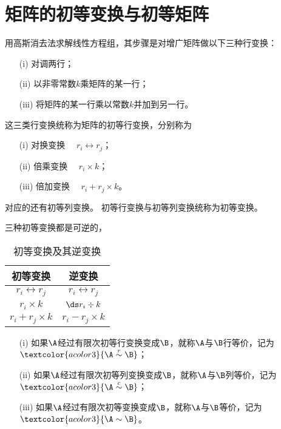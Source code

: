 \section{矩阵的初等变换与初等矩阵}

\begin{frame}\ft{\secname}
用高斯消去法求解线性方程组，其步骤是对增广矩阵做以下三种行变换：
\begin{itemize}
	\item[(i)] 对调两行；
	\item[(ii)] 以非零常数$k$乘矩阵的某一行；
	\item[(iii)] 将矩阵的某一行乘以常数$k$并加到另一行。
\end{itemize}
这三类行变换统称为\textcolor{acolor3}{矩阵的初等行变换}，\pause 分别称为
\begin{itemize}
	\item[(i)] \textcolor{acolor3}{对换变换}  $\quad r_i \leftrightarrow r_j$；
	\item[(ii)] \textcolor{acolor3}{倍乘变换}       $\quad r_i \times k$；
	\item[(iii)] \textcolor{acolor3}{倍加变换} $\quad r_i + r_j \times k $。
\end{itemize}
\pause 对应的还有\textcolor{acolor3}{初等列变换}。 \pause \textcolor{acolor1}{初等行变换与初等列变换统称为初等变换。}
\end{frame}


\begin{frame}\ft{\secname}
三种初等变换都是可逆的，
\begin{table}[htbp]
	\centering
	\begin{tabular}{|c|c|} \hline
		初等变换 &  逆变换 \\\hline
		$r_i \leftrightarrow r_j$ & $r_i \leftrightarrow r_j$ \\[0.2cm]\hline
		$r_i \times k$ & $\ds r_i \div k$ \\[0.2cm]\hline
		$r_i + r_j \times k$ & $r_i - r_j\times k$ \\[0.2cm]\hline
	\end{tabular}
	\caption{初等变换及其逆变换}
\end{table}

\end{frame}


\begin{frame}\ft{\secname}

\begin{dingyi}[矩阵的等价]
  
  \begin{itemize}
  \item[(i)] 如果$\A$经过有限次初等行变换变成$\B$，就称\textcolor{acolor1}{$\A$与$\B$行等价}，记为$\textcolor{acolor3}{\A\overset{r}{\sim} \B}$；
  \item[(ii)] 如果$\A$经过有限次初等列变换变成$\B$，就称\textcolor{acolor1}{$\A$与$\B$列等价}，记为$\textcolor{acolor3}{\A\overset{c}{\sim} \B}$；
  \item[(iii)] 如果$\A$经过有限次初等变换变成$\B$，就称\textcolor{acolor1}{$\A$与$\B$等价}，记为$\textcolor{acolor3}{\A\sim \B}$。
  \end{itemize}
\end{dingyi}
\end{frame}


